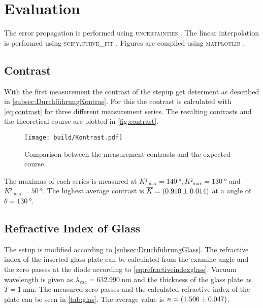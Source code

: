 \section{Evaluation}
\label{sec:auswertung}


The error propagation is performed using  \textsc{uncertainties} \cite{uncertainties}. The linear interpolation is performed using \textsc{scipy.curve\_fit} \cite{scipy}.
Figures are compiled using \textsc{matplotlib} \cite{matplotlib}. 
%

\subsection{Contrast}

With the first measurement the contrast of the stepup get determent as described in \autoref{subsec:DurchführungKontras}.
For this the contrast is calculated with \autoref{eq:contrast} for three different measurement series. 
The resulting contrasts and the theoretical course are plotted in \autoref{fig:contrast}.

\begin{figure}[H]
    \centering
    \texttt{[image: build/Kontrast.pdf]}
    \caption{Comparison between the measurement contrasts and the expected course.}
    \label{fig:contrast}
\end{figure}

The maximas of each series is measured at $K¹_{\text{max}} = \SI{140}{\degree},K²_{\text{max}} = \SI{130}{\degree}$ and $K³_{\text{max}} = \SI{50}{\degree}$.
The highest average contrast is $\overline{K} =  \SI{0.910 \pm 0.014}{}$ at a angle of $\theta = \SI{130}{\degree}$.

\subsection{Refractive Index of Glass}

The setup is modified according to \autoref{subsec:DruchführungGlass}. 
The refractive index of the inserted glass plate can be calculated from the examine angle and the zero passes at the diode according to \eqref{eq:refractiveindexglass}.
Vacuum wavelength is given as $\lambda_\text{vac} = \SI{632.990}{\nano\meter}$ \cite{v64} and the thickness of the glass plate as $T = \SI{1}{\milli\meter}$.
The measured zero passes and the calculated refractive index of the plate can be seen in \autoref{tab:glas}. The average value is $n = \SI{1.506 \pm 0.047}{}$.



